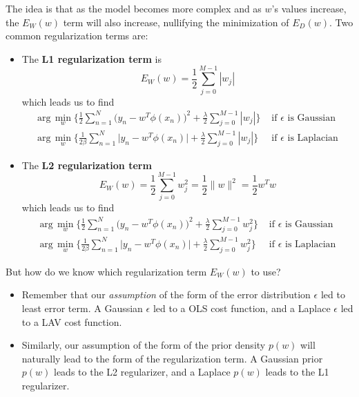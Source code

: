   The idea is that as the model becomes more complex and as $w$'s values increase, the $E_W (w)$ term will also increase, nullifying the minimization of $E_D (w)$. Two common regularization terms are:
  \begin{itemize}
    \item The \textbf{L1 regularization term} is
    \begin{equation}
      E_W (w) = \frac{1}{2} \sum_{j=0}^{M-1} |w_j|
    \end{equation}
    which leads us to find
    \begin{align*}
      \text{arg}\, \min_w \bigg\{ \frac{1}{2} \sum_{n=1}^N \big( y_n - w^T \phi(x_n) \big)^2  + \frac{\lambda}{2} \sum_{j=0}^{M-1} |w_j| \bigg\} & \text{ if } \epsilon \text{ is Gaussian} \\
      \text{arg}\, \min_w \bigg\{ \frac{1}{2 \beta} \sum_{n=1}^N \big| y_n - w^T \phi(x_n) \big| + \frac{\lambda}{2} \sum_{j=0}^{M-1} |w_j| \bigg\} & \text{ if } \epsilon \text{ is Laplacian}
    \end{align*}

    \item The \textbf{L2 regularization term}
    \begin{equation}
      E_W (w) = \frac{1}{2} \sum_{j=0}^{M-1} w_j^2 = \frac{1}{2} \|w\|^2 = \frac{1}{2} w^T w
    \end{equation}
    which leads us to find
    \begin{align*}
      \text{arg}\, \min_w \bigg\{ \frac{1}{2} \sum_{n=1}^N \big( y_n - w^T \phi(x_n) \big)^2  + \frac{\lambda}{2} \sum_{j=0}^{M-1} w_j^2 \bigg\} & \text{ if } \epsilon \text{ is Gaussian} \\
      \text{arg}\, \min_w \bigg\{ \frac{1}{2 \beta} \sum_{n=1}^N \big| y_n - w^T \phi(x_n) \big| + \frac{\lambda}{2} \sum_{j=0}^{M-1} w_j^2 \bigg\} & \text{ if } \epsilon \text{ is Laplacian}
    \end{align*}
  \end{itemize}

  But how do we know which regularization term $E_W (w)$ to use?
  \begin{itemize}
    \item Remember that our \textit{assumption} of the form of the error distribution $\epsilon$ led to least error term. A Gaussian $\epsilon$ led to a OLS cost function, and a Laplace $\epsilon$ led to a LAV cost function.
    \item Similarly, our assumption of the form of the prior density $p(w)$ will naturally lead to the form of the regularization term. A Gaussian prior $p(w)$ leads to the L2 regularizer, and a Laplace $p(w)$ leads to the L1 regularizer.
  \end{itemize}

